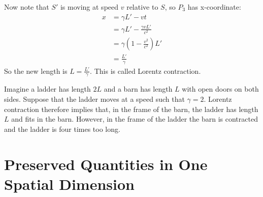 \documentclass[../Main.tex]{subfiles}
\begin{document}
Now note that $S'$ is moving at speed $v$ relative to $S$, so $P_3$ has x-coordinate:
\begin{align*}
    x &= \gamma L' - vt \\
    &= \gamma L' - \frac{\gamma v L'}{c^2} \\
    &= \gamma(1 - \frac{v^2}{c^2}) L' \\
    &= \frac{L'}{\gamma}
\end{align*}
So the new length is $L = \frac{L'}{\gamma}$. This is called Lorentz contraction.
\begin{example}
    Imagine a ladder has length $2L$ and a barn has length $L$ with open doors on both sides. Suppose that the ladder moves at a speed such that $\gamma = 2$. Lorentz contraction therefore implies that, in the frame of the barn, the ladder has length $L$ and fits in the barn. However, in the frame of the ladder the barn is contracted and the ladder is four times too long.
\end{example}
\section{Preserved Quantities in One Spatial Dimension}
\end{document}
